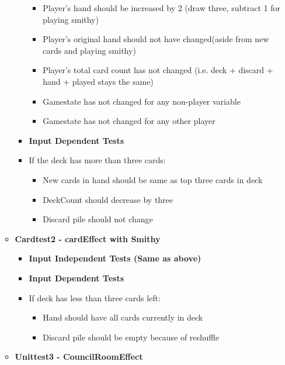 \documentclass[11pt,letterpaper]{article}
\begin{document}
\begin{enumerate}[label=\Roman*.]
\begin{itemize}[leftmargin=*]
\begin{itemize}[leftmargin=*, label={}]
            \begin{itemize}[leftmargin=*]
              \item Player's hand should be increased by 2 (draw three, subtract 1 for playing smithy)
              \item Player's original hand should not have changed(aside from new cards and playing smithy)
              \item Player's total card count has not changed (i.e. deck + discard + hand + played stays the same)
              \item Gamestate has not changed for any non-player variable
              \item Gamestate has not changed for any other player
            \end{itemize}

          \item \textbf{Input Dependent Tests}
          \item If the deck has more than three cards: 
            \begin{itemize}[leftmargin=*]
              \item New cards in hand should be same as top three cards in deck
              \item DeckCount should decrease by three
              \item Discard pile should not change
            \end{itemize}
        \end{itemize}

      \item \textbf{Cardtest2 - cardEffect with Smithy}
        \begin{itemize}[leftmargin=*, label={}]
          \item \textbf{Input Independent Tests (Same as above)}
          \item \textbf{Input Dependent Tests}
          \item If deck has less than three cards left: 
            \begin{itemize}[leftmargin=*]
              \item Hand should have all cards currently in deck
              \item Discard pile should be empty because of reshuffle
            \end{itemize}
        \end{itemize}

      \item \textbf{Unittest3 - CouncilRoomEffect}


\end{itemize}
\end{enumerate}
\end{document}
